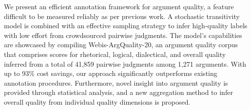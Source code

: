 We present an efficient annotation framework for argument quality, a feature difficult to be measured reliably as per previous work. A stochastic transitivity model is combined with an effective sampling strategy to infer high-quality labels with low effort from crowdsourced pairwise judgments. The model's capabilities are showcased by compiling Webis-ArgQuality-20, an argument quality corpus that comprises scores for rhetorical, logical, dialectical, and overall quality inferred from a total of 41,859 pairwise judgments among 1,271 arguments. With up to 93\% cost savings, our approach significantly outperforms existing annotation procedures. Furthermore, novel insight into argument quality is provided through statistical analysis, and a new aggregation method to infer overall quality from individual quality dimensions is proposed.
